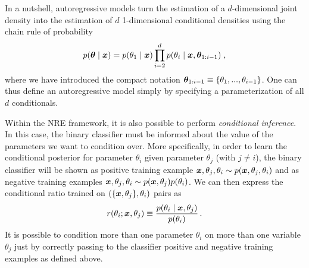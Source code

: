 In a nutshell, autoregressive models turn the estimation of a $d$-dimensional joint density into the estimation of $d$ 1-dimensional conditional densities using the chain rule of probability
\begin{equation}\label{eq:anre-autoregressive}
    p(\bm{\theta} \mid\bm{x}) =  p(\theta_1\mid\bm{x}) \prod_{i=2}^d p(\theta_i\mid\bm{x}, \bm{\theta}_{1:i-1})\;,
\end{equation}
where we have introduced the compact notation $\bm{\theta}_{1:i-1} \equiv \{\theta_1, ..., \theta_{i-1}\}$. One can thus define an autoregressive model simply by specifying a parameterization of all $d$ conditionals.

Within the NRE framework, it is also possible to perform \emph{conditional inference}. In this case, the binary classifier must be informed about the value of the parameters we want to condition over. More specifically, in order to learn the conditional posterior for parameter $\theta_i$ given parameter $\theta_j$ (with $j \neq i$), the binary classifier will be shown as positive training example $\bm{x}, \theta_j, \theta_i \sim p(\bm{x}, \theta_j, \theta_i)$ and as negative training examples $\bm{x}, \theta_j, \theta_i \sim p(\bm{x}, \theta_j)p(\theta_i)$. We can then express the conditional ratio trained on $(\{\bm{x}, \theta_j\}, \theta_i)$ pairs as
\begin{equation}
    \label{eq:ratio_conditional}
    r(\theta_i;\bm{x}, \theta_j) \equiv
    \frac{p(\theta_i \mid \bm{x}, \theta_j)}{ p(\theta_i)} \, .
\end{equation}
It is possible to condition more than one parameter $\theta_i$ on more than one variable $\theta_j$ just by correctly passing to the classifier positive and negative training examples as defined above. 

